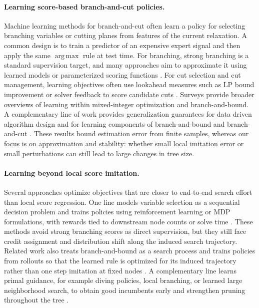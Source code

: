 \documentclass[smallextended,envcountsect]{svjour3} %
\newcommand{\0}{\mathbf{0}}
\DeclareMathOperator{\argmax}{arg\,max} %
\newcommand{\1}{\mathbf{1}} %
\begin{document}
\paragraph{Learning score-based branch-and-cut policies.}
Machine learning methods for branch-and-cut often learn a policy for selecting branching variables or cutting planes from features of the current relaxation.
A common design is to train a predictor of an expensive expert signal and then apply the same $\argmax$ rule at test time.
For branching, strong branching is a standard supervision target, and many approaches aim to approximate it using learned models or parameterized scoring functions \citep{Khalil2016,Alvarez2017,gasse2019exact,Gupta2020,zarpellon2021parameterizing}.
For cut selection and cut management, learning objectives often use lookahead measures such as LP bound improvement or solver feedback to score candidate cuts \citep{Paulus2022,huang2022learning,puigdemont2024learning,wang2023learning,tang2020reinforcement}.
Surveys \citep{bengio2021machine,scavuzzo2024machine} provide broader overviews of learning within mixed-integer optimization and branch-and-bound.
A complementary line of work provides generalization guarantees for data driven algorithm design and for learning components of branch-and-bound and branch-and-cut \citep{gupta2016pac,balcan2020data,balcan2021much,balcan2018learning,balcan2021sample,balcan2021improved,balcan2022structural,Cheng2024Learning,Cheng2024Sample,Cheng2025Generalization}.
These results bound estimation error from finite samples, whereas our focus is on approximation and stability: whether small local imitation error or small perturbations can still lead to large changes in tree size.

\paragraph{Learning beyond local score imitation.}
Several approaches optimize objectives that are closer to end-to-end search effort than local score regression.
One line models variable selection as a sequential decision problem and trains policies using reinforcement learning or MDP formulations, with rewards tied to downstream node counts or solve time \citep{etheve2020reinforcement,scavuzzo2022learning,parsonson2023reinforcement,strang2025mdp}.
These methods avoid strong branching scores as direct supervision, but they still face credit assignment and distribution shift along the induced search trajectory.
Related work also treats branch-and-bound as a search process and trains policies from rollouts so that the learned rule is optimized for its induced trajectory rather than one step imitation at fixed nodes \citep{he2014learningtosearch}.
A complementary line learns primal guidance, for example diving policies, local branching, or learned large neighborhood search, to obtain good incumbents early and strengthen pruning throughout the tree \citep{paulus2023dive,fischetti2003local,danna2005rins,liu2021revisiting,addanki2020neural,sonnerat2021learning,song2020general}.
\end{document}
